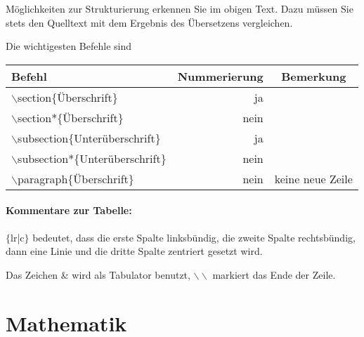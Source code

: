 \documentclass[12pt]{scrartcl}%
\theoremstyle{nonumberplain}
\begin{document}
Möglichkeiten zur Strukturierung  erkennen Sie im obigen Text. Dazu
müssen Sie stets den Quelltext mit dem Ergebnis des Übersetzens
vergleichen.

Die wichtigesten Befehle sind

\bigskip %

\begin{tabular}{lr|c} %
Befehl & Nummerierung & Bemerkung \\
\hline
  $\backslash$section$\{$Überschrift$\}$ 
& ja
\\  
$\backslash$section*$\{$Überschrift$\}$  
& nein
\\ $\backslash$subsection$\{$Unterüberschrift$\}$ & ja
\\ $\backslash$subsection*$\{$Unterüberschrift$\}$
& nein
\\ $\backslash$paragraph$\{$Überschrift$\}$  
& nein & keine neue Zeile
\end{tabular}

\paragraph{Kommentare zur Tabelle:}
$\{$lr|c$\}$ bedeutet, dass die erste Spalte linksbündig, die zweite
Spalte rechtsbündig, dann eine Linie und die dritte Spalte zentriert
gesetzt wird.

Das Zeichen \& wird als Tabulator benutzt, $\backslash\backslash$
markiert das Ende der Zeile.


\section{Mathematik}
\end{document}
